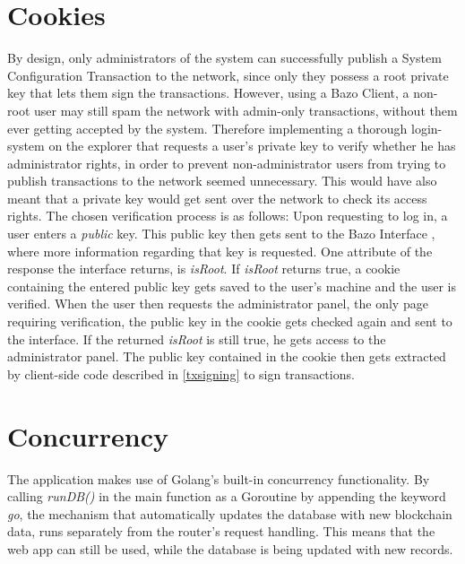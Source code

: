 \section{Cookies} \label{cookies}

By design, only administrators of the system can successfully publish a System Configuration Transaction to the network, since only they possess a root private key that lets them sign the transactions. However, using a Bazo Client, a non-root user may still spam the network with admin-only transactions, without them ever getting accepted by the system. Therefore implementing a thorough login-system on the explorer that requests a user's private key to verify whether he has administrator rights, in order to prevent non-administrator users from trying to publish transactions to the network seemed unnecessary. This would have also meant that a private key would get sent over the network to check its access rights. The chosen verification process is as follows:
Upon requesting to log in, a user enters a \emph{public} key. This public key then gets sent to the Bazo Interface \cite{marc}, where more information regarding that key is requested. One attribute of the response the interface returns, is \emph{isRoot}. If \emph{isRoot} returns true, a cookie containing the entered public key gets saved to the user's machine and the user is verified. When the user then requests the administrator panel, the only page requiring verification, the public key in the cookie gets checked again and sent to the interface. If the returned \emph{isRoot} is still true, he gets access to the administrator panel. The public key contained in the cookie then gets extracted by client-side code described in \ref{txsigning} to sign transactions.

\section{Concurrency} \label{goroutines}
The application makes use of Golang's built-in concurrency functionality. By calling \emph{runDB()} in the main function as a Goroutine by appending the keyword \emph{go}, the mechanism that automatically updates the database with new blockchain data, runs separately from the router's request handling. This means that the web app can still be used, while the database is being updated with new records.


